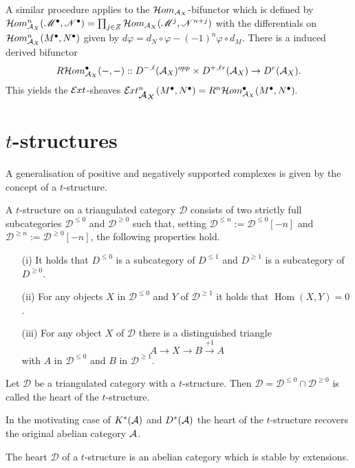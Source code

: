 A similar procedure applies to the $\Hom_{\AA_X}$-bifunctor which is defined by
$\Hom_{\AA_X}^n(\M^\bullet, \N^\bullet) \ab = \prod_{j\in Z} \Hom_{\AA_X}(\M^j , \N^{n+j}) $
with the differentials on $\Hom_{\AA_X}^n(M^\bullet,N^\bullet)$ given by $d\varphi = d_N\circ \varphi - (-1)^n \varphi \circ d_M$.
There is a induced derived bifunctor
$$R\Hom_{\AA_X}^\bullet(\blank,\blank):: D^{-,\ell}(\AA_X)^{opp}\times D^{+,\ell r}(\AA_X)\to D^{r}(\AA_X).$$
This yields the $\Ext$-sheaves
$\Ex{\AA_X}{n}(M^\bullet,N^\bullet) =  R^n\Hom_{\AA_X}^\bullet(M^\bullet, N^\bullet).$


\section{$t$-structures}
A generalisation of positive and negatively supported complexes is given by the concept of a $t$-structure.
\begin{definition}
 A $t$-structure on a triangulated category $\mathcal{D}$ consists of two strictly full subcategories $\mathcal{D}^{\leq 0}$ and $\mathcal{D}^{\geq 0}$ such that, setting $\mathcal{D}^{\leq n} := \mathcal{D}^{\leq 0}[-n]$ and $\mathcal{D}^{\geq n} := \mathcal{D}^{\geq 0} [-n]$, the following properties hold.
 \begin{enumerate}
   \item[(i)] It holds that $D^{\leq 0}$ is a subcategory of $D^{\leq 1}$ and $D^{\geq 1}$ is a subcategory of $D^{\geq 0}$.
   \item[(ii)] For any objects $X$ in $\mathcal{D}^{\leq 0}$ and $Y$ of $\mathcal{D}^{\geq 1}$ it holds that $\operatorname{Hom}(X,Y) = 0$.
   \item[(iii)] For any object $X$ of $\mathcal{D}$ there is a distinguished triangle
   $$A \to X \to B \xrightarrow{+1} A $$
   with $A$ in $\mathcal{D}^{\leq 0}$ and $B$ in $\mathcal{D}^{\geq 1}$.
 \end{enumerate}
\end{definition}
\begin{definition}
 Let $\mathcal{D}$ be a triangulated category with a $t$-structure. Then $\mathcal{D} = \mathcal{D}^{\leq 0} \cap \mathcal{D}^{\geq 0}$ is called the heart of the $t$-structure.
\end{definition}
In the motivating case of $K^*(\AA)$ and $D^*(\AA)$ the heart of the $t$-structure recovers the original abelian category $\AA$.
\begin{proposition}\label{prop: HeartExtension}
 The heart $\mathcal{D}$ of a $t$-structure is an abelian category which is stable by extensions.
\end{proposition}
